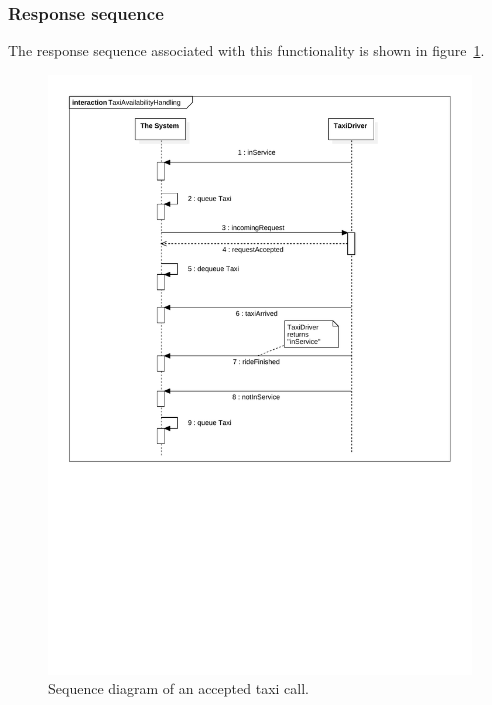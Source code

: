 \subsubsection{Response sequence}
The response sequence associated with this functionality is shown in figure~\ref{fig:taxi_availability}.
\begin{figure}
\includegraphics[width=\textwidth]{diagrams/taxi_availability_handling.pdf}
\caption{Sequence diagram of an accepted taxi call.}
\label{fig:taxi_availability}
\end{figure}

